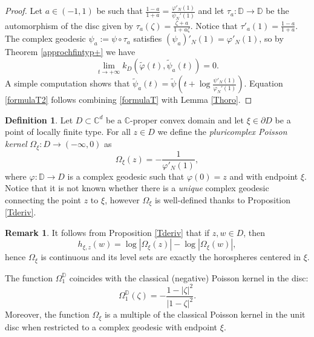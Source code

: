 \documentclass[11pt, reqno]{amsart}
\numberwithin{equation}{section}
\theoremstyle{definition}
\newtheorem{remark}[theorem]{Remark}
\newtheorem{definition}[theorem]{Definition}
\newcommand{\C}{\mathbb{C}}
\newcommand{\D}{\mathbb{D}}
\begin{document}
{{{		\begin{proof}
			Let $a\in(-1,1)$ be such that $\frac{1-a}{1+a}=\frac{\varphi'_N(1)}{\psi_N'(1)}$ and let   $\tau_a\colon\D\to\D$ be the automorphism of the disc given by $\tau_a(\zeta)=\frac{\zeta+a}{1+a\zeta}$. Notice that $\tau'_a(1)=\frac{1-a}{1+a}.$ 
			The complex geodesic $\psi_a:=\psi\circ\tau_a$ satisfies $(\psi_a)'_N(1)=\varphi'_N(1)$, so by Theorem \ref{approchfintyp+} we have
			$$\lim_{t\to+\infty}{k_D}(\tilde \varphi(t),\tilde{\psi}_a(t))=0.$$
			A simple computation shows that $\tilde{\psi}_a(t)=\tilde \psi\left(t+\log\frac{\psi'_N(1)}{\varphi_N'(1)}\right)$.
			Equation \ref{formulaT2}  follows combining  \eqref{formulaT} with Lemma \ref{Thoro}.
		\end{proof}
		\begin{definition}
			Let $D\subset\C^d$ be a $\C$-proper convex domain and let $\xi\in\partial D$ be a point of locally finite type.
			For all $z\in D$ we define the {\sl pluricomplex Poisson kernel}  $\Omega_\xi\colon D\to (-\infty,0)$ as
			$$\Omega_\xi(z)=-\frac{1}{\varphi'_N(1)},$$ where $\varphi\colon \D\to D$ is a complex geodesic such that $\varphi(0)=z$ and with endpoint $\xi$. Notice that it is not known whether there is a \emph{unique} complex geodesic connecting the point $z$ to $\xi$, however $\Omega_\xi$ is well-defined thanks to Proposition \ref{Tderiv}.
		\end{definition}
		
		
		
		
		
		\begin{remark}\label{omegahorofunction}
			It follows from Proposition \ref{Tderiv} that if $z,w\in D$, then
			\begin{equation}\label{orosferepoisson}
				h_{\xi,z}(w)=\log |\Omega_\xi(z)|-\log  |\Omega_\xi(w)|,
			\end{equation}
			hence $\Omega_\xi$ is continuous and its level sets are exactly the horospheres centered in $\xi$.
		\end{remark}
		
		The function $\Omega^\D_1$ coincides with the classical (negative) Poisson kernel in the disc:
		$$\Omega^\D_1(\zeta)=-\frac{1-|\zeta|^2}{|1-\zeta|^2}.$$
		Moreover, the function $\Omega_\xi$ is a multiple of the classical Poisson kernel in the unit disc when restricted to a complex geodesic with endpoint $\xi$.
		
}}}
\end{document}
